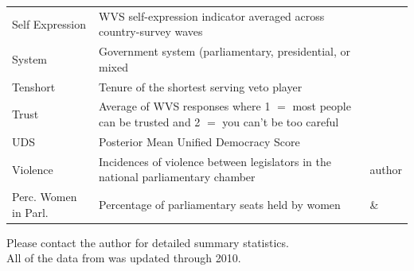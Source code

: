 \documentclass[a4paper]{article}\usepackage[]{graphicx}\usepackage[]{color}
\begin{document}
\begin{table}[!h]
\begin{center}
\begin{tabular}{l m{7cm} m{3.5cm}}
            Self Expression & WVS self-expression indicator averaged across country-survey waves & \cite{WVS2009} \\
            System & Government system (parliamentary, presidential, or mixed & \cite{DPI2001} \\
            Tenshort & Tenure of the shortest serving veto player & \cite{DPI2001} \\
            Trust & Average of WVS responses where 1 $=$ most people can be trusted and 2 $=$ you can't be too careful & \cite{WVS2009} \\
            UDS & Posterior Mean Unified Democracy Score & \cite{Pemstein2010} \\
            Violence & Incidences of violence between legislators in the national parliamentary chamber & author \\
            Perc. Women in Parl. & Percentage of parliamentary seats held by women & \cite{WomParCrossNat} \& \cite{IPU2013} \\
            \hline

    \end{tabular}
    \end{center}
    \begin{singlespace}
        Please contact the author for detailed summary statistics. \\
        All of the data from \cite{DPI2001} was updated through 2010.
    \end{singlespace}
\end{table}  
\end{document}
